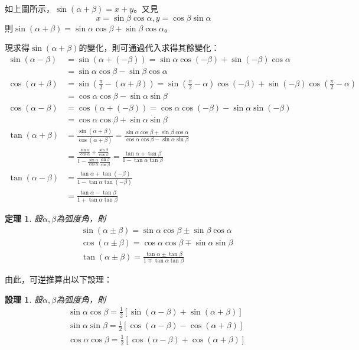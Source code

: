 \documentclass[12pt]{article}
\newtheorem*{theorem}{定理}
\newtheorem*{proposition}{設理}
\begin{document}
    如上圖所示，$\sin(\alpha+\beta)=x+y$。又見$$x=\sin{\beta}\cos{\alpha}, y=\cos{\beta}\sin{\alpha}$$則$\sin(\alpha+\beta)=\sin{\alpha}\cos{\beta}+\sin{\beta}\cos{\alpha}$。

    現求得$\sin(\alpha+\beta)$的變化，則可通過代入求得其餘變化：\begin{align*}
        \sin(\alpha-\beta)&=\sin(\alpha+(-\beta))=\sin{\alpha}\cos(-\beta)+\sin(-\beta)\cos{\alpha}\\&=\sin{\alpha}\cos{\beta}-\sin{\beta}\cos{\alpha}\\
        \cos(\alpha+\beta)&=\sin(\frac{\pi}{2}-(\alpha+\beta))=\sin(\frac{\pi}{2}-\alpha)\cos(-\beta)+\sin(-\beta)\cos(\frac{\pi}{2}-\alpha)\\&=\cos{\alpha}\cos{\beta}-\sin{\alpha}\sin{\beta}\\
        \cos(\alpha-\beta)&=\cos(\alpha+(-\beta))=\cos{\alpha}\cos(-\beta)-\sin{\alpha}\sin(-\beta)\\&=\cos{\alpha}\cos{\beta}+\sin{\alpha}\sin{\beta}\\
        \tan(\alpha+\beta)&=\frac{\sin(\alpha+\beta)}{\cos(\alpha+\beta)}=\frac{\sin{\alpha}\cos{\beta}+\sin{\beta}\cos{\alpha}}{\cos{\alpha}\cos{\beta}-\sin{\alpha}\sin{\beta}}\\&=\frac{\frac{\sin{\alpha}}{\cos{\alpha}}+\frac{\sin{\beta}}{\cos{\beta}}}{1-\frac{\sin{\alpha}}{\cos{\alpha}}\frac{\sin{\beta}}{\cos{\beta}}}=\frac{\tan{\alpha}+\tan{\beta}}{1-\tan{\alpha}\tan{\beta}}\\
        \tan(\alpha-\beta)&=\frac{\tan{\alpha}+\tan(-\beta)}{1-\tan{\alpha}\tan(-\beta)}\\
        &=\frac{\tan{\alpha}-\tan{\beta}}{1+\tan{\alpha}\tan{\beta}}
    \end{align*}

    \begin{theorem}
        設$\alpha,\beta$為弧度角，則\begin{align*}
            &\sin(\alpha\pm\beta)=\sin{\alpha}\cos{\beta}\pm\sin{\beta}\cos{\alpha}\\
            &\cos(\alpha\pm\beta)=\cos{\alpha}\cos{\beta}\mp\sin{\alpha}\sin{\beta}\\
            &\tan(\alpha\pm\beta)=\frac{\tan{\alpha}\pm\tan{\beta}}{1\mp\tan{\alpha}\tan{\beta}}
        \end{align*}
    \end{theorem}

    由此，可逆推算出以下設理：

    \begin{proposition}
        設$\alpha,\beta$為弧度角，則\begin{align*}
            &\sin{\alpha}\cos{\beta}=\frac{1}{2}[\sin(\alpha-\beta)+\sin(\alpha+\beta)]\\
            &\sin{\alpha}\sin{\beta}=\frac{1}{2}[\cos(\alpha-\beta)-\cos(\alpha+\beta)]\\
            &\cos{\alpha}\cos{\beta}=\frac{1}{2}[\cos(\alpha-\beta)+\cos(\alpha+\beta)]
        \end{align*}
    \end{proposition}
\end{document}
